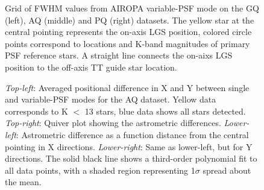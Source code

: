 \documentclass[]{spie}  %
\begin{document}
\begin{figure}
 \caption{\footnotesize Grid of FWHM values from AIROPA variable-PSF mode on the GQ (left), AQ (middle) and PQ (right) datasets. The yellow star at the central pointing represents the on-axis LGS position, colored circle points correspond to locations and K-band magnitudes of primary PSF reference stars. A straight line connects the on-aixs LGS position to the off-axis TT guide star location. \label{fig:fwhm_grids}}
\end{figure}

\begin{figure}
 \caption{\footnotesize \textit{Top-left}: Averaged positional difference in X and Y between single and variable-PSF modes for the AQ dataset. Yellow data corresponds to K $<$ 13 stars, blue data shows all stars detected. \textit{Top-right}: Quiver plot showing the astrometric differences. \textit{Lower-left}: Astrometric difference as a function distance from the central pointing in X directions. \textit{Lower-right}: Same as lower-left, but for Y directions. The solid black line shows a third-order polynomial fit to all data points, with a shaded region representing 1$\sigma$ spread about the mean. \label{fig:gc_astrom}}
\end{figure}
\end{document}
